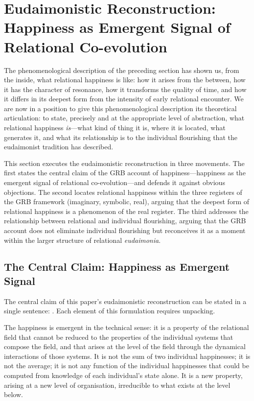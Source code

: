 \section{Eudaimonistic Reconstruction: Happiness as Emergent Signal of Relational Co-evolution}
\label{p14:sec:reconstruction}

\noindent
The phenomenological description of the preceding section has shown us, from the inside, what relational happiness is like: how it arises from the between, how it has the character of resonance, how it transforms the quality of time, and how it differs in its deepest form from the intensity of early relational encounter. We are now in a position to give this phenomenological description its theoretical articulation: to state, precisely and at the appropriate level of abstraction, what relational happiness \emph{is}---what kind of thing it is, where it is located, what generates it, and what its relationship is to the individual flourishing that the eudaimonist tradition has described.

This section executes the eudaimonistic reconstruction in three movements. The first states the central claim of the GRB account of happiness---happiness as the emergent signal of relational co-evolution---and defends it against obvious objections. The second locates relational happiness within the three registers of the GRB framework (imaginary, symbolic, real), arguing that the deepest form of relational happiness is a phenomenon of the real register. The third addresses the relationship between relational and individual flourishing, arguing that the GRB account does not eliminate individual flourishing but reconceives it as a moment within the larger structure of relational \emph{eudaimonia}.

\subsection{The Central Claim: Happiness as Emergent Signal}
\label{p14:subsec:emergentsignal}

\noindent
The central claim of this paper's eudaimonistic reconstruction can be stated in a single sentence: . Each element of this formulation requires unpacking.

 The happiness is emergent in the technical sense: it is a property of the relational field that cannot be reduced to the properties of the individual systems that compose the field, and that arises at the level of the field through the dynamical interactions of those systems. It is not the sum of two individual happinesses; it is not the average; it is not any function of the individual happinesses that could be computed from knowledge of each individual's state alone. It is a new property, arising at a new level of organisation, irreducible to what exists at the level below.

